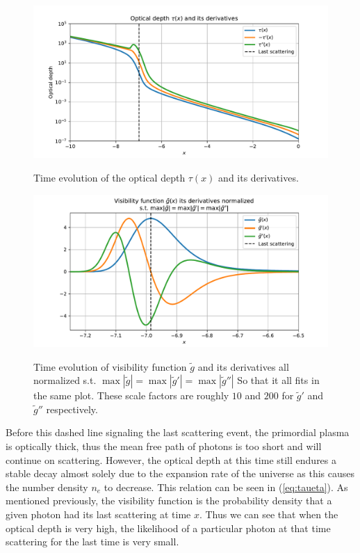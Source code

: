 \documentclass[%
reprint,
 amsmath,amssymb,
 aps,
]{revtex4-2}
\begin{document}
\begin{figure}[ht!]
	\caption{Time evolution of the optical depth $\tau(x)$ and its derivatives.}
	\includegraphics[width = \linewidth]{Figures/tau_and_derivs.pdf}
	\label{fig:tau}
\end{figure}
\begin{figure}[ht!]
	\caption{Time evolution of visibility function $\tilde g$ and its derivatives all normalized s.t. $\max|\tilde g|=\max|\tilde g'|=\max|\tilde g''|$ So that it all fits in the same plot. These scale factors are roughly $10$ and $200$ for $\tilde g'$ and $\tilde g''$ respectively.}
	\includegraphics[width = \linewidth]{Figures/gtilde.pdf}
	\label{fig:gtilde}
\end{figure}

Before this dashed line signaling the last scattering event, the primordial plasma is optically thick, thus the mean free path of photons is too short and will continue on scattering. However, the optical depth at this time still endures a stable decay almost solely due to the expansion rate of the universe as this causes the number density $n_e$ to decrease. This relation can be seen in (\ref{eq:taueta}). As mentioned previously, the visibility function is the probability density that a given photon had its last scattering at time $x$. Thus we can see that when the optical depth is very high, the likelihood of a particular photon at that time scattering for the last time is very small. 
\end{document}
